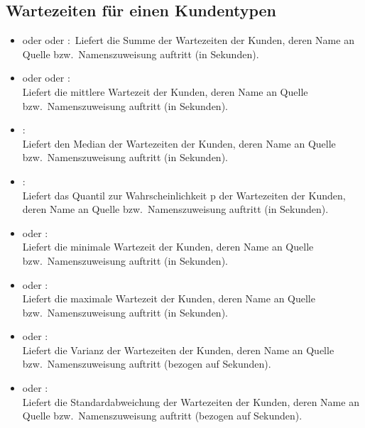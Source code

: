 \subsection{Wartezeiten für einen Kundentypen}

\begin{itemize}

\item
{} oder  oder :\
Liefert die Summe der Wartezeiten der Kunden, deren Name an Quelle bzw.\ Namenszuweisung  auftritt (in Sekunden).

\item
{} oder  oder :\\
Liefert die mittlere Wartezeit der Kunden, deren Name an Quelle bzw.\ Namenszuweisung \cm{id} auftritt (in Sekunden).

\item
{}:\\
Liefert den Median der Wartezeiten der Kunden, deren Name an Quelle bzw.\ Namenszuweisung  auftritt (in Sekunden).

\item
{}:\\
Liefert das Quantil zur Wahrscheinlichkeit p der Wartezeiten der Kunden, deren Name an Quelle bzw.\ Namenszuweisung  auftritt (in Sekunden).

\item
{} oder :\\
Liefert die minimale Wartezeit der Kunden, deren Name an Quelle bzw.\ Namenszuweisung  auftritt (in Sekunden).

\item
{} oder :\\
Liefert die maximale Wartezeit der Kunden, deren Name an Quelle bzw.\ Namenszuweisung  auftritt (in Sekunden).

\item
{} oder :\\
Liefert die Varianz der Wartezeiten der Kunden, deren Name an Quelle bzw.\ Namenszuweisung  auftritt (bezogen auf Sekunden).

\item
{} oder :\\
Liefert die Standardabweichung der Wartezeiten der Kunden, deren Name an Quelle bzw.\ Namenszuweisung  auftritt (bezogen auf Sekunden).


\end{itemize}
